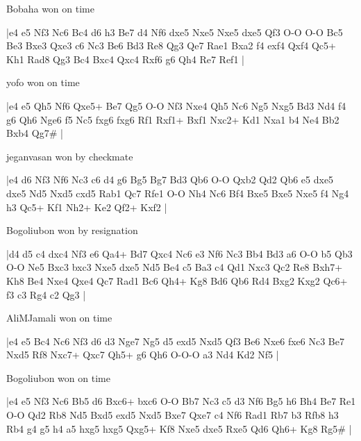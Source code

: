 \showboard

Bobaha won on time

\makegametitle
|e4 e5 Nf3 Nc6 Bc4 d6 h3 Be7 d4 Nf6 dxe5 Nxe5 Nxe5 dxe5 Qf3 O-O O-O Bc5 Be3 Bxe3 Qxe3 c6 Nc3 Be6 Bd3 Re8 Qg3 Qe7 Rae1 Bxa2 f4 exf4 Qxf4 Qc5+ Kh1 Rad8 Qg3 Bc4 Bxc4 Qxc4 Rxf6 g6 Qh4 Re7 Ref1  |

\showboard

yofo won on time

\makegametitle
|e4 e5 Qh5 Nf6 Qxe5+ Be7 Qg5 O-O Nf3 Nxe4 Qh5 Nc6 Ng5 Nxg5 Bd3 Nd4 f4 g6 Qh6 Nge6 f5 Nc5 fxg6 fxg6 Rf1 Rxf1+ Bxf1 Nxc2+ Kd1 Nxa1 b4 Ne4 Bb2 Bxb4 Qg7\#  |

\showboard

jeganvasan won by checkmate

\makegametitle
|e4 d6 Nf3 Nf6 Nc3 c6 d4 g6 Bg5 Bg7 Bd3 Qb6 O-O Qxb2 Qd2 Qb6 e5 dxe5 dxe5 Nd5 Nxd5 cxd5 Rab1 Qc7 Rfe1 O-O Nh4 Nc6 Bf4 Bxe5 Bxe5 Nxe5 f4 Ng4 h3 Qc5+ Kf1 Nh2+ Ke2 Qf2+ Kxf2  |

\showboard

Bogoliubon won by resignation

\makegametitle
|d4 d5 c4 dxc4 Nf3 e6 Qa4+ Bd7 Qxc4 Nc6 e3 Nf6 Nc3 Bb4 Bd3 a6 O-O b5 Qb3 O-O Ne5 Bxc3 bxc3 Nxe5 dxe5 Nd5 Be4 c5 Ba3 c4 Qd1 Nxc3 Qc2 Re8 Bxh7+ Kh8 Be4 Nxe4 Qxe4 Qc7 Rad1 Bc6 Qh4+ Kg8 Bd6 Qb6 Rd4 Bxg2 Kxg2 Qc6+ f3 c3 Rg4 c2 Qg3  |

\showboard

AliMJamali won on time

\makegametitle
|e4 e5 Bc4 Nc6 Nf3 d6 d3 Nge7 Ng5 d5 exd5 Nxd5 Qf3 Be6 Nxe6 fxe6 Nc3 Be7 Nxd5 Rf8 Nxc7+ Qxc7 Qh5+ g6 Qh6 O-O-O a3 Nd4 Kd2 Nf5  |

\showboard

Bogoliubon won on time

\makegametitle
|e4 e5 Nf3 Nc6 Bb5 d6 Bxc6+ bxc6 O-O Bb7 Nc3 c5 d3 Nf6 Bg5 h6 Bh4 Be7 Re1 O-O Qd2 Rb8 Nd5 Bxd5 exd5 Nxd5 Bxe7 Qxe7 c4 Nf6 Rad1 Rb7 b3 Rfb8 h3 Rb4 g4 g5 h4 a5 hxg5 hxg5 Qxg5+ Kf8 Nxe5 dxe5 Rxe5 Qd6 Qh6+ Kg8 Rg5\#  |

